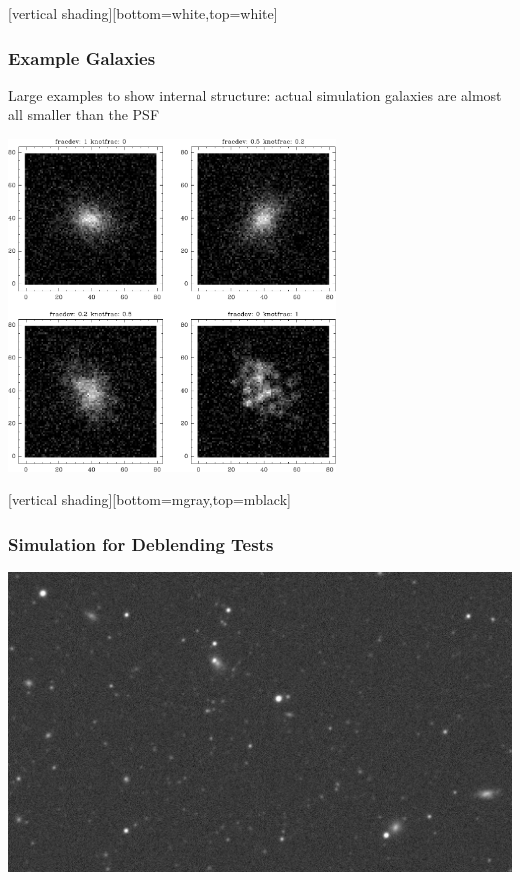 \documentclass{beamer}
\begin{document}
[vertical shading][bottom=white,top=white]
{

    \frame
    {
        \frametitle{Example Galaxies}
     
    {\color{black}
        {\small Large examples to show internal structure:  actual simulation
        galaxies are almost all smaller than the PSF }
        }

        \begin{center}
            \includegraphics[width=0.65\textwidth]{mosaic-009086.pdf}
            \newline
        \end{center}

    }


}

[vertical shading][bottom=mgray,top=mblack]


\frame
{
    \frametitle{Simulation for Deblending Tests }
 
    \begin{center}
        \includegraphics[width=\columnwidth]{nbrsim-003f-009969-image-crop.jpg}
    \end{center}

}
\end{document}
